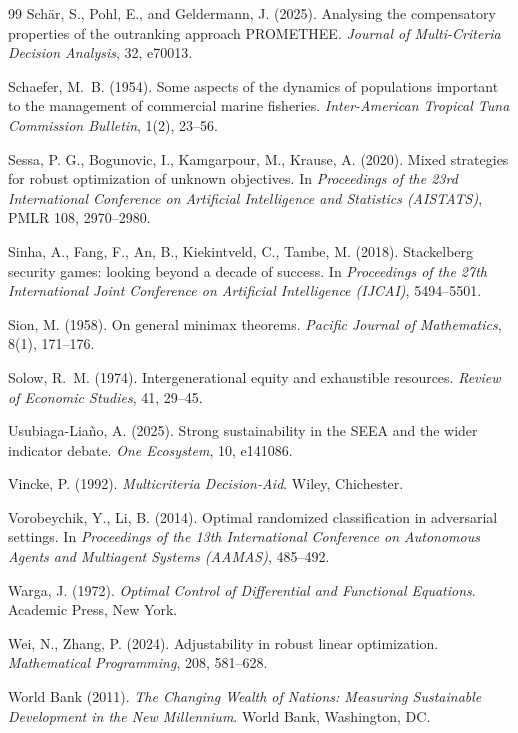\begin{thebibliography}{99}
 Sch\"ar, S., Pohl, E., and Geldermann, J. (2025). Analysing the compensatory properties of the outranking approach PROMETHEE. \emph{Journal of Multi-Criteria Decision Analysis}, 32, e70013.

 Schaefer, M.~B. (1954). Some aspects of the dynamics of populations important to the management of commercial marine fisheries. \emph{Inter-American Tropical Tuna Commission Bulletin}, 1(2), 23--56.

 Sessa, P. G., Bogunovic, I., Kamgarpour, M., Krause, A. (2020). Mixed strategies for robust optimization of unknown objectives. In \emph{Proceedings of the 23rd International Conference on Artificial Intelligence and Statistics (AISTATS)}, PMLR 108, 2970--2980.

 Sinha, A., Fang, F., An, B., Kiekintveld, C., Tambe, M. (2018). Stackelberg security games: looking beyond a decade of success. In \emph{Proceedings of the 27th International Joint Conference on Artificial Intelligence (IJCAI)}, 5494--5501.

 Sion, M. (1958). On general minimax theorems. \emph{Pacific Journal of Mathematics}, 8(1), 171--176.

 Solow, R.~M. (1974). Intergenerational equity and exhaustible resources. \emph{Review of Economic Studies}, 41, 29--45.

 Usubiaga-Lia\~no, A. (2025). Strong sustainability in the SEEA and the wider indicator debate. \emph{One Ecosystem}, 10, e141086.

 Vincke, P. (1992). \emph{Multicriteria Decision-Aid}. Wiley, Chichester.

 Vorobeychik, Y., Li, B. (2014). Optimal randomized classification in adversarial settings. In \emph{Proceedings of the 13th International Conference on Autonomous Agents and Multiagent Systems (AAMAS)}, 485--492.

 Warga, J. (1972). \emph{Optimal Control of Differential and Functional Equations}. Academic Press, New York.

 Wei, N., Zhang, P. (2024). Adjustability in robust linear optimization. \emph{Mathematical Programming}, 208, 581--628.

 World Bank (2011). \emph{The Changing Wealth of Nations: Measuring Sustainable Development in the New Millennium}. World Bank, Washington, DC.

\end{thebibliography}


